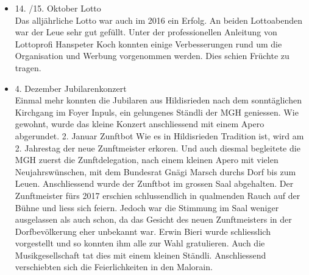 \begin{history}
\begin{itemize}
            \item 14. /15. Oktober Lotto\\
                  Das alljährliche Lotto war auch im 2016 ein Erfolg. An beiden
                  Lottoabenden war der Leue sehr gut gefüllt. Unter der
                  professionellen Anleitung von Lottoprofi Hanspeter Koch
                  konnten einige Verbesserungen rund um die Organisation und
                  Werbung vorgenommen werden. Dies schien Früchte zu tragen.

            \item 4. Dezember Jubilarenkonzert\\
                  Einmal mehr konnten die Jubilaren aus Hildisrieden nach dem
                  sonntäglichen Kirchgang im Foyer Inpuls, ein gelungenes
                  Ständli der MGH geniessen. Wie gewohnt, wurde das kleine
                  Konzert anschliessend mit einem Apero abgerundet. 2. Januar
                  Zunftbot Wie es in Hildisrieden Tradition ist, wird am 2.
                  Jahrestag der neue Zunftmeister erkoren.  Und auch diesmal
                  begleitete die MGH zuerst die Zunftdelegation, nach einem
                  kleinen Apero mit vielen Neujahrswünschen, mit dem Bundesrat
                  Gnägi Marsch durchs Dorf bis zum Leuen. Anschliessend wurde
                  der Zunftbot im grossen Saal abgehalten. Der Zunftmeister fürs
                  2017 erschien schlussendlich in qualmenden Rauch auf der Bühne
                  und liess sich feiern. Jedoch war die Stimmung im Saal weniger
                  ausgelassen als auch schon, da das Gesicht des neuen
                  Zunftmeisters in der Dorfbevölkerung eher unbekannt war. Erwin
                  Bieri wurde schliesslich vorgestellt und so konnten ihm alle
                  zur Wahl gratulieren. Auch die Musikgesellschaft tat dies mit
                  einem kleinen Ständli. Anschliessend verschiebten sich die
                  Feierlichkeiten in den Malorain.


      \end{itemize}

\end{history}
